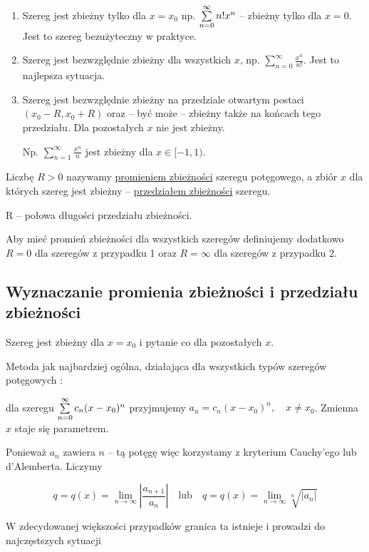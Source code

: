 \begin{enumerate}
    \item Szereg jest zbieżny tylko dla $x=x_0$ np. $ \sum\limits_{n = 0}^{\infty} n!x^n $ -- zbieżny tylko dla $x=0$.
    Jest to szereg bezużyteczny w praktyce.
    \item Szereg jest bezwzględnie zbieżny dla wszystkich $x$, np. $ \sum\limits_{n = 0}^{\infty} \frac{x^n}{n!} $.
    Jest to najlepsza sytuacja.
    \item Szereg jest bezwzględnie zbieżny na przedziale otwartym postaci $(x_0 - R, x_0 + R)$ oraz -- być może -- zbieżny
    także na końcach tego przedziału. Dla pozostałych $x$ nie jest zbieżny.

    Np. $ \sum\limits_{n=1}^{\infty} \frac{x^n}{n} $ jest zbieżny dla $x \in [-1, 1)$. \\
\end{enumerate}

Liczbę $R > 0$ nazywamy \underline{promieniem zbieżności} szeregu potęgowego, a zbiór $x$ dla których szereg
jest zbieżny -- \underline{przedziałem zbieżności} szeregu.

R -- połowa długości przedziału zbieżności.

Aby mieć promień zbieżności dla wszystkich szeregów definiujemy dodatkowo $R = 0$ dla szeregów z przypadku 1 oraz
$R = \infty$ dla szeregów z przypadku 2.


\subsection{Wyznaczanie promienia zbieżności i przedziału zbieżności}

Szereg jest zbieżny dla $x = x_0$ i pytanie co dla pozostałych $x$.

Metoda jak najbardziej ogólna, działająca dla wszystkich typów szeregów potęgowych :

dla szeregu $ \sum\limits_{n = 0}^{\infty} c_n(x-x_0)^n $ przyjmujemy $ a_n = c_n(x - x_0)^n, \quad x \neq x_0 $.
Zmienna $x$ staje się parametrem.

Ponieważ $a_n$ zawiera $n$ -- tą potęgę więc korzystamy z kryterium Cauchy'ego lub d'Alemberta. Liczymy

$$ q = q(x) = \lim_{n \to \infty} \left| \frac{a_{n+1}}{a_n} \right| \quad \textrm{lub} \quad 
q = q(x) = \lim_{n \to \infty} \sqrt[n]{|a_n|} $$

W zdecydowanej większości przypadków granica ta istnieje i prowadzi do najczęstszych sytuacji

